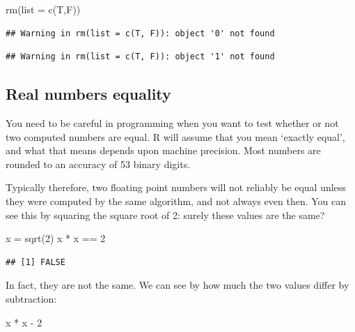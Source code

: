 \documentclass[
]{book}
\newenvironment{Shaded}{\begin{snugshade}}{\end{snugshade}}
\newcommand{\AttributeTok}[1]{\textcolor[rgb]{0.77,0.63,0.00}{#1}}
\newcommand{\DecValTok}[1]{\textcolor[rgb]{0.00,0.00,0.81}{#1}}
\newcommand{\FunctionTok}[1]{\textcolor[rgb]{0.00,0.00,0.00}{#1}}
\newcommand{\NormalTok}[1]{#1}
\newcommand{\OtherTok}[1]{\textcolor[rgb]{0.56,0.35,0.01}{#1}}
\newcommand{\SpecialCharTok}[1]{\textcolor[rgb]{0.00,0.00,0.00}{#1}}
\theoremstyle{definition}
\theoremstyle{definition}
\theoremstyle{definition}
\theoremstyle{definition}
\theoremstyle{remark}
\begin{document}
\begin{Shaded}
\begin{Highlighting}[]
\FunctionTok{rm}\NormalTok{(}\AttributeTok{list =} \FunctionTok{c}\NormalTok{(T,F))}
\end{Highlighting}
\end{Shaded}

\begin{verbatim}
## Warning in rm(list = c(T, F)): object '0' not found
\end{verbatim}

\begin{verbatim}
## Warning in rm(list = c(T, F)): object '1' not found
\end{verbatim}

\hypertarget{real-numbers-equality}{%
\subsection{Real numbers equality}\label{real-numbers-equality}}

You need to be careful in programming when you want to test whether or not two computed numbers are equal. R will assume that you mean `exactly equal', and what that means depends upon machine precision. Most numbers are rounded to an accuracy of 53 binary digits.

Typically therefore, two floating point numbers will not reliably be equal unless they were computed by the same algorithm, and not always even then. You can see this by squaring the square root of 2: surely these values are the same?

\begin{Shaded}
\begin{Highlighting}[]
\NormalTok{x }\OtherTok{=} \FunctionTok{sqrt}\NormalTok{(}\DecValTok{2}\NormalTok{)}
\NormalTok{x }\SpecialCharTok{*}\NormalTok{ x }\SpecialCharTok{==} \DecValTok{2}
\end{Highlighting}
\end{Shaded}

\begin{verbatim}
## [1] FALSE
\end{verbatim}

In fact, they are not the same. We can see by how much the two values differ by subtraction:

\begin{Shaded}
\begin{Highlighting}[]
\NormalTok{x }\SpecialCharTok{*}\NormalTok{ x }\SpecialCharTok{{-}} \DecValTok{2}
\end{Highlighting}
\end{Shaded}
\end{document}
